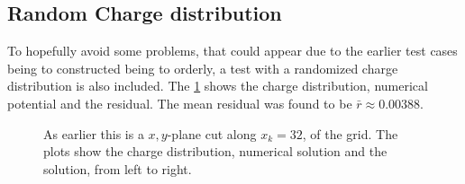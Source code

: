 	\subsection{Random Charge distribution}
		To hopefully avoid some problems, that could appear due to the earlier test
		cases being to constructed being to orderly, a test with a randomized
		charge distribution is also included. The \cref{fig:random} shows the
		charge distribution, numerical potential and the residual. The mean residual was
			found to be \(\bar{r} \approx 0.00388\).
		\begin{figure}
			\centering
			\caption{As earlier this is a \(x,y\)-plane cut along \(x_k=32\), of the grid. The plots show the charge distribution,
			numerical solution and the solution, from left to right.}
			\label{fig:random}
		\end{figure}
